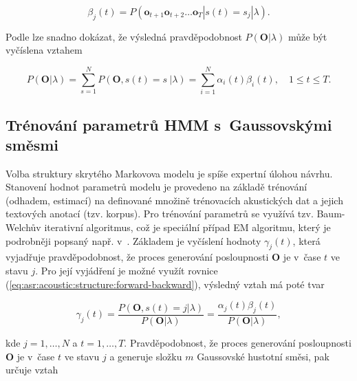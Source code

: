 \begin{equation}
  \beta_j\left(t\right) = P\left(\boldsymbol{o}_{t+1}\boldsymbol{o}_{t+2}\dots \boldsymbol{o}_T|s\left(t\right)=s_j|\lambda\right).
  \label{eq:asr:acoustic:structure:backward}
\end{equation}

\noindent Podle \cite{Psutka2006} lze snadno dokázat, že výsledná pravděpodobnost $P\left(\boldsymbol{O}|\lambda\right)$ může být vyčíslena vztahem

\begin{equation}
  P\left(\boldsymbol{O}|\lambda\right) = \sum_{s=1}^{N} P\left(\boldsymbol{O}, s\left(t\right) = s~| \lambda\right) = \sum_{i = 1}^{N} \alpha_{i}\left(t\right)\beta_{i}\left(t\right), \quad 1 \leq t \leq T.
  \label{eq:asr:acoustic:structure:forward-backward}
\end{equation}


\subsection{Trénování parametrů HMM s~Gaussovskými směsmi}
\label{chap:asr:acoustic:GMM}

Volba struktury skrytého Markovova modelu je spíše expertní úlohou návrhu. Stanovení hodnot parametrů modelu je provedeno na základě trénování (odhadem, estimací) na definované množině trénovacích akustických dat a jejich textových anotací (tzv. korpus). Pro trénování parametrů se využívá tzv. Baum-Welchův iterativní algoritmus, což je speciální případ EM algoritmu, který je podrobněji popsaný např. v~\cite{Holmes2001}. Základem je vyčíslení hodnoty $\gamma_{j}\left(t\right)$, která vyjadřuje pravděpodobnost, že proces generování posloupnosti $\boldsymbol{O}$ je v~čase $t$ ve stavu $j$. Pro její vyjádření je možné využít rovnice (\ref{eq:asr:acoustic:structure:forward-backward}), výsledný vztah má poté tvar

\begin{equation}
  \gamma_{j}\left(t\right) = \frac{P\left(\boldsymbol{O}, s\left(t\right)=j|\lambda\right)}{P\left(\boldsymbol{O}|\lambda\right)} = \frac{\alpha_{j}\left(t\right)\beta_{j}\left(t\right)}{P\left(\boldsymbol{O}|\lambda\right)} ,
   \label{eq:asr:acoustic:structure:gamma}
\end{equation}

\noindent kde $j = 1,\dots,N$ a $t = 1, \dots, T$. Pravděpodobnost, že proces generování posloupnosti $\boldsymbol{O}$ je v~čase $t$ ve stavu $j$ a generuje složku $m$ Gaussovské hustotní směsi, pak určuje vztah

